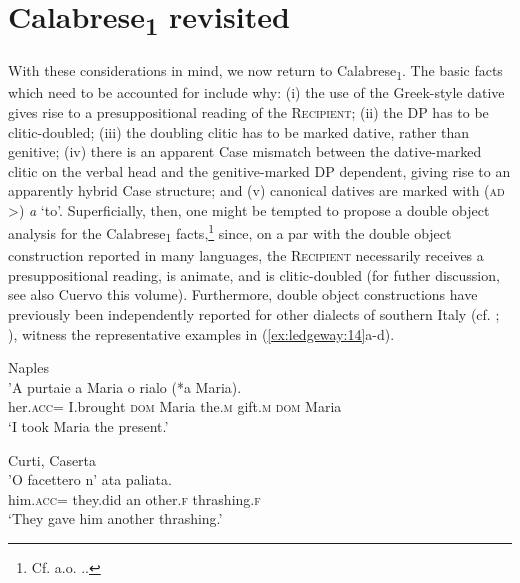 \documentclass[output=paper,modfonts,nonflat,colorlinks,citecolor=brown]{langsci/langscibook}
\begin{document}
\section{Calabrese\textsubscript{1} revisited}

With these considerations in mind, we now return to Calabrese\textsubscript{1}. The basic facts which need to be accounted for include why: (i) the use of the Greek-style dative gives rise to a presuppositional reading of the \textsc{Recipient}; (ii) the DP has to be clitic-doubled; (iii) the doubling clitic has to be marked dative, rather than genitive; (iv) there is an apparent Case mismatch between the dative-marked clitic on the verbal head and the genitive-marked DP dependent, giving rise to an apparently hybrid Case structure; and (v) canonical datives are marked with (\textsc{ad} >) \textit{a} ‘to’. Superficially, then, one might be tempted to propose a double object analysis for the Calabrese\textsubscript{1} facts,\footnote{Cf. a.o. \citet{BarssLasnik1986,Larson1988, Larson1990,Jackendoff1990larson,CollinsThráinsson1993,Marantz1993,Demonte1995,Pesetsky1995,Collins1997,Torrego1998,Harley2002,Pyllkänen2008,Anagnostopoulou2003,Cuervo2003,Jeong2007,Bruening2010DOC, Bruening2010Ditrans,OrmazabalRomero2010,HarleyJung2015,Pineda2016}..} since, on a par with the double object construction reported in many languages, the \textsc{Recipient} necessarily receives a presuppositional reading, is animate, and is clitic-doubled (for futher discussion, see also Cuervo this volume). Furthermore, double object constructions have previously been independently reported for other dialects of southern Italy (cf. \citealt[ch.2]{Ledgeway2000}; \citealt[844-847]{Ledgeway2009}), witness the representative examples in (\ref{ex:ledgeway:14}a-d). 

\ea\label{ex:ledgeway:14}
\ea Naples\\

\gll ’A  purtaie  a  Maria  o  rialo  (*a  Maria).\\
    her.\textsc{acc}=  I.brought  \textsc{dom}  Maria  the.\textsc{m}  gift.\textsc{m}    \textsc{dom}  Maria\\
    \glt `I took Maria the present.'

\ex Curti, Caserta\\
    \gll ’O  facettero  n’  ata  paliata.\\
    him.\textsc{acc}=  they.did  an  other.\textsc{f}  thrashing.\textsc{f}\\
    \glt `They gave him another thrashing.'
\end{document}
